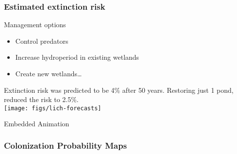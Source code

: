 \documentclass[color=usenames,dvipsnames]{beamer}
\begin{document}
\begin{frame}
  \frametitle{Estimated extinction risk}
   Management options %
        \begin{itemize}
          \item<1-> Control predators
          \item<1-> Increase hydroperiod in existing wetlands
          \item<1-> Create new wetlands\dots
        \end{itemize}
    \pause
    \vfill
    Extinction risk was predicted to be 4\% after 50
    years. Restoring just 1 pond, reduced the risk to 2.5\%.  \\
    \centering
    \texttt{[image: figs/lich-forecasts]}
\end{frame}






\begin{frame}{Embedded Animation}
  \frametitle{Colonization Probability Maps}
  \centering
   \\
\end{frame}
\end{document}
